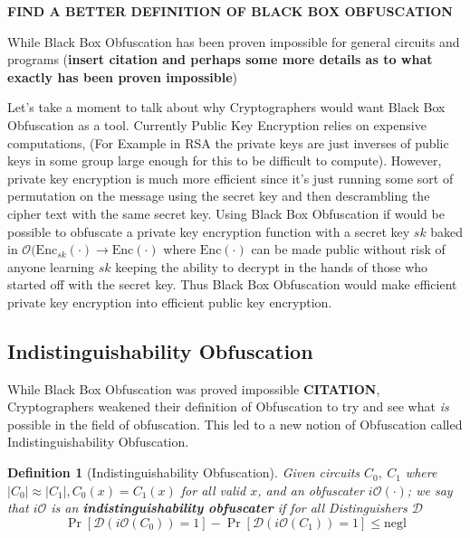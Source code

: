 \documentclass[12pt,twoside]{reedthesis}
\newtheorem{definition}{Definition}
\newcommand{\enc}[0]{\text{Enc}}
\begin{document}
    \begin{center}
    \textbf{ FIND A BETTER DEFINITION OF BLACK BOX OBFUSCATION}
    \end{center}
    
    \par While Black Box Obfuscation has been proven impossible for general circuits and programs (\textbf{insert citation and perhaps some more details as to what exactly has been proven impossible}) 
    \par Let's take a moment to talk about why Cryptographers would want Black Box Obfuscation as a tool. Currently Public Key Encryption relies on expensive computations, (For Example in RSA the private keys are just inverses of public keys in some group large enough for this to be difficult to compute). However, private key encryption is much more efficient since it's just running some sort of permutation on the message using the secret key and then descrambling the cipher text with the same secret key. Using Black Box Obfuscation if would be possible to obfuscate a private key encryption function with a secret key $sk$ baked in $\mathcal{O}(\enc_{sk}(\cdot) \rightarrow \enc(\cdot)$ where $\enc(\cdot)$ can be made public without risk of anyone learning $sk$ keeping the ability to decrypt in the hands of those who started off with the secret key. Thus Black Box Obfuscation would make efficient private key encryption into efficient public key encryption.
    
    \subsection{Indistinguishability Obfuscation}
    While Black Box Obfuscation was proved impossible \textbf{CITATION}, Cryptographers weakened their definition of Obfuscation to try and see what \textit{is} possible in the field of obfuscation. This led to a new notion of Obfuscation called Indistinguishability Obfuscation. 
    \newcommand{\iO}[0]{\textit{i}\mathcal{O}}
    
    
    \begin{definition}[Indistinguishability Obfuscation]
    Given circuits $C_0,\ C_1$ where $|C_0| \approx |C_1|, C_0(x) = C_1(x)$ for all valid $x$, and an obfuscater $\iO(\cdot)$; we say that $\iO$ is an \textbf{indistinguishability obfuscater} if for all Distinguishers $\mathcal{D}$
    $$\Pr[\mathcal{D}(\iO(C_0)) = 1] -\Pr[\mathcal{D}(\iO(C_1)) = 1] \leq \text{negl}$$
    \end{definition}
    
\end{document}
